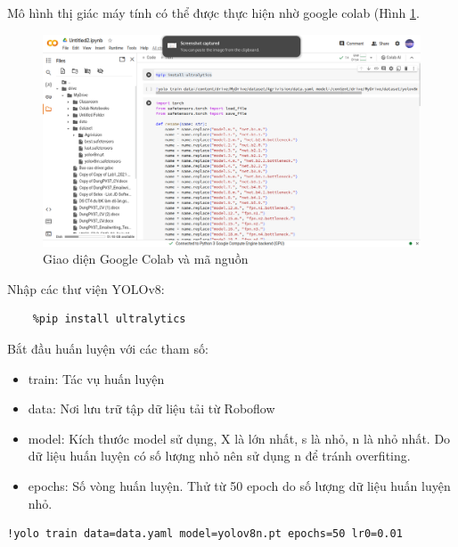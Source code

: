 Mô hình thị giác máy tính có thể được thực hiện nhờ google colab (Hình \ref{fig:colab-ui}.

\begin{figure}[h]
    \centering
    \includegraphics[width=0.85\linewidth]{images/colab-inteface.png}
    \caption{Giao diện Google Colab và mã nguồn}
    \label{fig:colab-ui}
\end{figure}

Nhập các thư viện YOLOv8:
\begin{lstlisting}
    %pip install ultralytics
\end{lstlisting}

Bắt đầu huấn luyện với các tham số:

\begin{itemize}
    \item train: Tác vụ huấn luyện
    \item data: Nơi lưu trữ tập dữ liệu tải từ Roboflow
    \item model: Kích thước model sử dụng, X là lớn nhất, s là nhỏ, n là nhỏ nhất. Do dữ liệu huấn luyện có số lượng nhỏ nên sử dụng n để tránh overfiting.
    \item epochs: Số vòng huấn luyện. Thử từ 50 epoch do số lượng dữ liệu huấn luyện nhỏ.
\end{itemize}
\begin{lstlisting}
!yolo train data=data.yaml model=yolov8n.pt epochs=50 lr0=0.01
\end{lstlisting}


